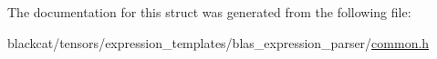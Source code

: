 The documentation for this struct was generated from the following file\+:\begin{DoxyCompactItemize}
\item 
blackcat/tensors/expression\+\_\+templates/blas\+\_\+expression\+\_\+parser/\hyperlink{tensors_2expression__templates_2blas__expression__parser_2common_8h}{common.\+h}\end{DoxyCompactItemize}
